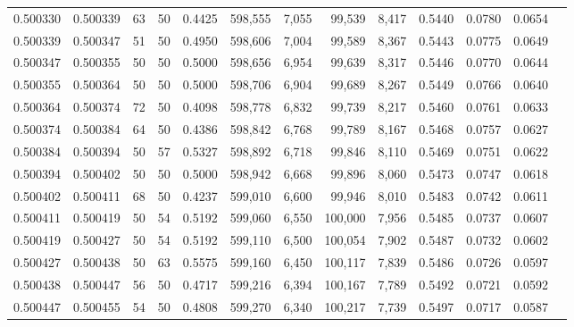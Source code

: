 \begin{tabular}{rrrrrrrrrrrrr}
0.500330 & 0.500339 &    63 &  50 &                                     0.4425 & 598,555 &   7,055 &  99,539 &   8,417 & 0.5440 & 0.0780 & 0.0654 \\
0.500339 & 0.500347 &    51 &  50 &                                     0.4950 & 598,606 &   7,004 &  99,589 &   8,367 & 0.5443 & 0.0775 & 0.0649 \\
0.500347 & 0.500355 &    50 &  50 &                                     0.5000 & 598,656 &   6,954 &  99,639 &   8,317 & 0.5446 & 0.0770 & 0.0644 \\
0.500355 & 0.500364 &    50 &  50 &                                     0.5000 & 598,706 &   6,904 &  99,689 &   8,267 & 0.5449 & 0.0766 & 0.0640 \\
0.500364 & 0.500374 &    72 &  50 &                                     0.4098 & 598,778 &   6,832 &  99,739 &   8,217 & 0.5460 & 0.0761 & 0.0633 \\
0.500374 & 0.500384 &    64 &  50 &                                     0.4386 & 598,842 &   6,768 &  99,789 &   8,167 & 0.5468 & 0.0757 & 0.0627 \\
0.500384 & 0.500394 &    50 &  57 &                                     0.5327 & 598,892 &   6,718 &  99,846 &   8,110 & 0.5469 & 0.0751 & 0.0622 \\
0.500394 & 0.500402 &    50 &  50 &                                     0.5000 & 598,942 &   6,668 &  99,896 &   8,060 & 0.5473 & 0.0747 & 0.0618 \\
0.500402 & 0.500411 &    68 &  50 &                                     0.4237 & 599,010 &   6,600 &  99,946 &   8,010 & 0.5483 & 0.0742 & 0.0611 \\
0.500411 & 0.500419 &    50 &  54 &                                     0.5192 & 599,060 &   6,550 & 100,000 &   7,956 & 0.5485 & 0.0737 & 0.0607 \\
0.500419 & 0.500427 &    50 &  54 &                                     0.5192 & 599,110 &   6,500 & 100,054 &   7,902 & 0.5487 & 0.0732 & 0.0602 \\
0.500427 & 0.500438 &    50 &  63 &                                     0.5575 & 599,160 &   6,450 & 100,117 &   7,839 & 0.5486 & 0.0726 & 0.0597 \\
0.500438 & 0.500447 &    56 &  50 &                                     0.4717 & 599,216 &   6,394 & 100,167 &   7,789 & 0.5492 & 0.0721 & 0.0592 \\
0.500447 & 0.500455 &    54 &  50 &                                     0.4808 & 599,270 &   6,340 & 100,217 &   7,739 & 0.5497 & 0.0717 & 0.0587 \\

\end{tabular}
